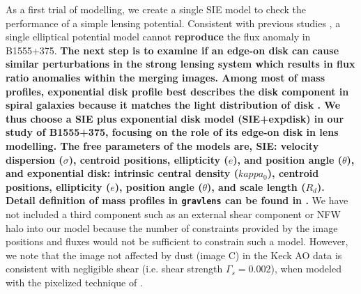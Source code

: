 \documentclass[useAMS,usenatbib]{mn2e}
\begin{document}
As a first trial of modelling, we create a single SIE model to check
the performance of a simple lensing potential. Consistent with
previous studies \citep{Marlow99, Xu14}, a single elliptical
potential model cannot \textbf{reproduce} the flux anomaly in B1555+375.
\textbf{The next step is to examine if an edge-on disk can cause similar perturbations in the strong lensing system  which results in flux ratio anomalies within the merging images. Among most of mass profiles, exponential disk profile best describes the disk component in spiral galaxies because it matches the light distribution of disk \citep{Kee98}. We thus choose a SIE plus exponential disk model (SIE+expdisk) in our study of B1555+375, focusing on the role of its edge-on disk in lens modelling. The free parameters of the models are, SIE: velocity dispersion ($\sigma$), centroid positions, ellipticity ($e$), and position angle ($\theta$), and exponential disk: intrinsic central density ($kappa_0$), centroid positions, ellipticity ($e$), position angle ($\theta$), and scale length ($R_d$). Detail definition of mass profiles in {\tt gravlens} can be found in \citet{Kee01}.}
  We have not included a third component such as an external
shear component or NFW halo into our model because the number of constraints provided by the
image positions and fluxes would not be sufficient to constrain such a
model. However, we note that the image not affected by dust (image C)
in the Keck AO data is consistent with negligible shear (i.e. shear
strength $\Gamma_s=0.002$), when modeled with the pixelized technique
of \citet{V09}.
\end{document}
